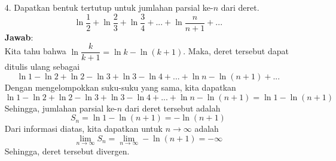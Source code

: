 \documentclass{article}
\newcommand{\jawab}{\textbf{Jawab}:}
\begin{document}
\begin{enumerate}
\begin{enumerate}
            \item[(m)] $\displaystyle \sum_{k=1}^{\infty} (e/\pi)^{k-1}$\\\\
            \jawab\\
            Kita tahu bahwa $(e/\pi)^{k-1} = \dfrac{e^{k-1}}{\pi^{k-1}} = \dfrac{\pi}{e}\cdot \dfrac{e^k}{\pi^k}$. Maka, deret tersebut dapat ditulis ulang sebagai
            \[\sum_{k=1}^{\infty} \dfrac{\pi}{e}\cdot \left(\dfrac{e}{\pi}\right)^{k} = \dfrac{\pi}{e}\sum_{k=1}^{\infty} \left(\dfrac{e}{\pi}\right)^k\]
            Deret $\displaystyle \sum_{k=1}^{\infty} \left(\dfrac{e}{\pi}\right)^k$ adalah deret geometri dengan $a = e/\pi$ dan $r = e/\pi$. Perhatikan bahwa $e=2,78...$ dan 
            $\pi=3,14...$, maka $e<\pi\implies \dfrac{e}{\pi}<1$. Karena $|r| < 1$, maka deret tersebut konvergen dan nilainya adalah
            \[\dfrac{\pi}{e}\sum_{k=1}^{\infty} \left(\dfrac{e}{\pi}\right)^k=\dfrac{\pi}{e}\cdot\frac{1}{1-\dfrac{e}{\pi}}=\dfrac{\pi}{e}\cdot\frac{\pi}{\pi-e}=\frac{\pi^2}{e\pi-e^2}\]
        \end{enumerate}
        \item[4.] Dapatkan bentuk tertutup untuk jumlahan parsial ke-$n$ dari deret.
        \[\ln\frac{1}{2}+\ln\frac{2}{3}+\ln\frac{3}{4}+...+\ln\frac{n}{n+1}+...\]
        \jawab\\
        Kita tahu bahwa $\ln\dfrac{k}{k+1} = \ln k - \ln (k+1)$. Maka, deret tersebut dapat ditulis ulang sebagai
        \[\ln 1 - \ln 2 + \ln 2 - \ln 3 + \ln 3 - \ln 4 + ... + \ln n - \ln (n+1) + ...\]
        Dengan mengelompokkan suku-suku yang sama, kita dapatkan
        \[\ln 1 - \ln 2 + \ln 2 - \ln 3 + \ln 3 - \ln 4 + ... + \ln n - \ln (n+1) = \ln 1 - \ln (n+1)\]
        Sehingga, jumlahan parsial ke-$n$ dari deret tersebut adalah
        \[S_n = \ln 1 - \ln (n+1) = -\ln (n+1)\]
        Dari informasi diatas, kita dapatkan untuk $n\to\infty$ adalah
        \[\lim_{n\to\infty}S_n=\lim_{n\to\infty}-\ln (n+1)=-\infty\]
        Sehingga, deret tersebut divergen.


\end{enumerate}
\end{document}
